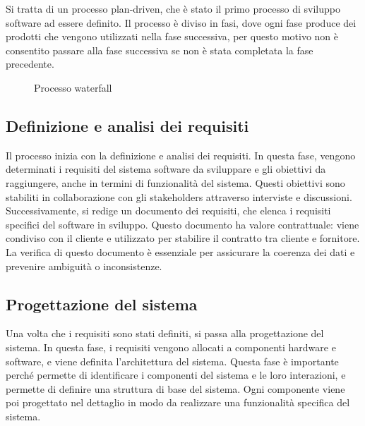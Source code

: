 Si tratta di un processo plan-driven, che è stato il primo processo di sviluppo
software ad essere definito. Il processo è diviso in fasi, dove ogni fase
produce dei prodotti che vengono utilizzati nella fase successiva, per questo motivo non 
è consentito passare alla fase successiva se non è stata completata la fase precedente.

\begin{figure}[H]
    \centering
    \caption{Processo waterfall}
\end{figure}
\subsection{Definizione e analisi dei requisiti} 
Il processo inizia con la definizione e analisi dei requisiti. In questa fase,
vengono determinati i requisiti del sistema software da sviluppare e gli obiettivi
da raggiungere, anche in termini di funzionalità del sistema. Questi obiettivi sono
stabiliti in collaborazione con gli stakeholders attraverso interviste e discussioni.
Successivamente, si redige un documento dei requisiti, che elenca i requisiti specifici
del software in sviluppo. Questo documento ha valore contrattuale: viene condiviso con
il cliente e utilizzato per stabilire il contratto tra cliente e fornitore. La
verifica di questo documento è essenziale
per assicurare la coerenza dei dati e prevenire ambiguità o inconsistenze.
\subsection{Progettazione del sistema}
Una volta che i requisiti sono stati definiti, si passa alla progettazione del sistema.
In questa fase, i requisiti vengono allocati a componenti hardware e software, e viene
definita l'architettura del sistema. Questa fase è importante perché permette di
identificare i componenti del sistema e le loro interazioni, e permette di definire
una struttura di base del sistema. Ogni componente viene poi progettato 
nel dettaglio in modo da realizzare una funzionalità specifica del sistema. 

